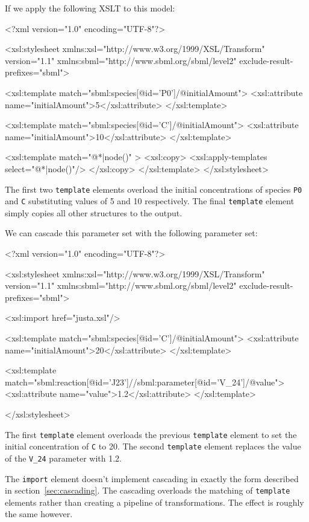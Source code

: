 \documentclass[10pt,twocolumntoc]{cekarticle}
\begin{document}
If we apply the following XSLT to this model:
\begin{example}
<?xml version="1.0" encoding="UTF-8"?>

<xsl:stylesheet  xmlns:xsl="http://www.w3.org/1999/XSL/Transform" version="1.1"
    xmlns:sbml="http://www.sbml.org/sbml/level2" exclude-result-prefixes="sbml">

<xsl:template match="sbml:species[@id='P0']/@initialAmount">
<xsl:attribute name="initialAmount">5</xsl:attribute>
</xsl:template>

<xsl:template match="sbml:species[@id='C']/@initialAmount">
<xsl:attribute name="initialAmount">10</xsl:attribute>
</xsl:template>

<xsl:template match="@*|node()" >
  <xsl:copy>
    <xsl:apply-templates select="@*|node()"/>
  </xsl:copy>
</xsl:template>
</xsl:stylesheet>
\end{example}

The first two \texttt{template} elements overload the initial concentrations of species
\texttt{P0} and \texttt{C} substituting values of 5 and 10 respectively.  The final
\texttt{template} element simply copies all other structures to the output.

We can cascade this parameter set with the following parameter set:

\begin{example}
<?xml version="1.0" encoding="UTF-8"?>

<xsl:stylesheet  xmlns:xsl="http://www.w3.org/1999/XSL/Transform" version="1.1"
    xmlns:sbml="http://www.sbml.org/sbml/level2" exclude-result-prefixes="sbml">

<xsl:import href="justa.xsl"/>

<xsl:template match="sbml:species[@id='C']/@initialAmount">
<xsl:attribute name="initialAmount">20</xsl:attribute>
</xsl:template>

<xsl:template match="sbml:reaction[@id='J23']//sbml:parameter[@id='V_24']/@value">
<xsl:attribute name="value">1.2</xsl:attribute>
</xsl:template>

</xsl:stylesheet>
\end{example} 

The first \texttt{template} element overloads the previous \texttt{template} element to
set the initial concentration of \texttt{C} to 20.  The second \texttt{template} element 
replaces the value of the \texttt{V\_24} parameter with 1.2.

The \texttt{import} element doesn't implement cascading in exactly the form described in
section~\ref{sec:cascading}.  The cascading overloads the matching of \texttt{template}
elements rather than creating a pipeline of transformations.  The effect is roughly the same
however.
\end{document}
